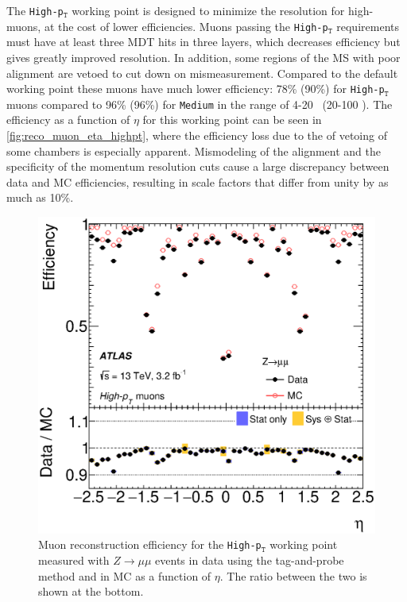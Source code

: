 The \texttt{High-p$_\texttt{T}$} working point is designed to minimize the resolution for high-\pt muons, at the cost of lower efficiencies. Muons passing the \texttt{High-p$_\texttt{T}$} requirements must have at least three \ac{MDT} hits in three layers, which decreases efficiency but gives greatly improved \pt resolution. In addition, some regions of the \ac{MS} with poor alignment are vetoed to cut down on mismeasurement. Compared to the default working point these muons have much lower efficiency: 78\% (90\%) for \texttt{High-p$_\texttt{T}$} muons compared to 96\% (96\%) for \texttt{Medium} in the \pt range of 4-20 \gev~(20-100 \gev). The efficiency as a function of $\eta$ for this working point can be seen in \autoref{fig:reco_muon_eta_highpt}, where the efficiency loss due to the of vetoing of some chambers is especially apparent. Mismodeling of the alignment and the specificity of the momentum resolution cuts cause a large discrepancy between data and \ac{MC} efficiencies, resulting in scale factors that differ from unity by as much as 10\%. 

\begin{centering}
\begin{figure}[!hbt]
\myfloatalign
\includegraphics[width=.9\linewidth]{figures/reco/fig_03c.eps}
\caption{Muon reconstruction efficiency for the \texttt{High-p$_\texttt{T}$} working point measured with $Z\rightarrow\mu\mu$ events in data using the tag-and-probe method and in \ac{MC} as a function of $\eta$. The ratio between the two is shown at the bottom. \cite{1603.05598} }
\label{fig:reco_muon_eta_highpt}
\end{figure}
\end{centering}

